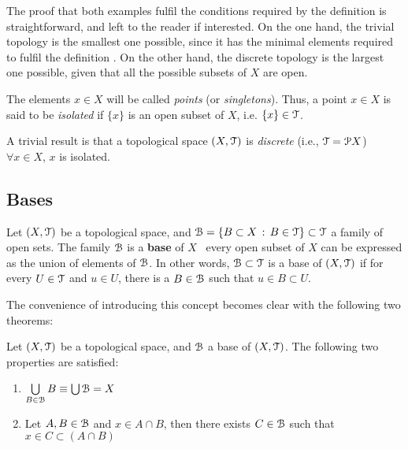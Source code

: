 The proof that both examples fulfil the conditions required by the definition
 is straightforward, and left to the reader if interested.
On the one hand, the trivial topology is the smallest one possible, since it has the
minimal elements required to fulfil the definition .
On the other hand, the discrete topology is the largest one possible, given that all
the possible subsets of $X$ are open.

\begin{definition}
	The elements $x\in X$ will be called \emph{points} (or \emph{singletons}).
	Thus, a point $x\in X$ is said to be \emph{isolated} if $\{x\}$ is an open subset
	of $X$, i.e. $\{x\}\in \EuScript{T}$.
\end{definition}

\begin{remark}
	A trivial result is that a topological space $(X,\EuScript{T})$ is \emph{discrete} (i.e.,
	$\EuScript{T}=\EuScript{P} X$) \iff\ $\forall x\in X$, $x$ is isolated.
\end{remark}

\subsection{Bases}\label{subsec:bases}

\begin{definition}
	Let $(X, \EuScript{T})$ be a topological space, and $\EuScript{B} = \{B \subset X\,:\, B \in \EuScript{T}\}\subset\EuScript{T}$
	a family of open sets.
	The family $\EuScript{B}$ is a \textbf{base} of $X$ \iff\, every open subset of $X$ can be
	expressed as the union of elements of $\EuScript{B}$. In other words, $\EuScript{B}\subset\EuScript{T}$ is a base
	of $(X,\EuScript{T})$ if for every $U\in\EuScript{T}$ and $u\in U$, there is a $B\in \EuScript{B}$ such that
	$u\in B\subset U$.
	\label{def:base}
\end{definition}

The convenience of introducing this concept becomes clear with the following two theorems:

\begin{theorem}
	Let $(X, \EuScript{T})$ be a topological space, and $\EuScript{B}$ a base of $(X, \EuScript{T})$.
	The following two properties are satisfied:
	\begin{enumerate}
		\item $\bigcup\limits_{B\in\EuScript{B}} B \equiv \bigcup\EuScript{B} = X$
		\item Let $A, B\in \EuScript{B}$ and $x\in A\cap B$, then there exists $C\in \EuScript{B}$ such
		that $x\in C\subset (A\cap B)$
	\end{enumerate}
\end{theorem}

